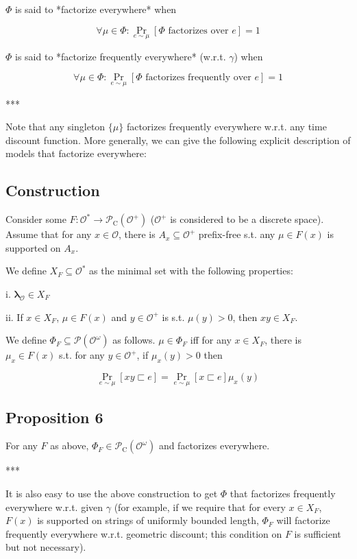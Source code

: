 \documentclass[a4paper]{article}
\DeclareMathOperator{\Prb}{Pr}
\newcommand{\Estr}{\boldsymbol{\lambda}}
\newcommand{\Prob}{\mathcal{P}}
\newcommand{\Obs}{\mathcal{O}}
\newcommand{\ObsO}{\Obs^\omega}
\newcommand{\CC}{\mathcal{P}_{\operatorname{C}}}
\begin{document}
${\Phi}$ is said to *factorize everywhere* when 

$${\forall \mu \in \Phi: \Prb_{e \sim \mu}[\Phi \text{ factorizes over } e] = 1}$$

${\Phi}$ is said to *factorize frequently everywhere* (w.r.t. ${\gamma}$) when

$${\forall \mu \in \Phi: \Prb_{e \sim \mu}[\Phi \text{ factorizes frequently over } e] = 1}$$

***

Note that any singleton ${\{\mu\}}$ factorizes frequently everywhere w.r.t. any time discount function. More generally, we can give the following explicit description of models that factorize everywhere:

\subsection{Construction}

Consider some ${F: \Obs^* \rightarrow \CC(\Obs^+)}$ (${\Obs^+}$ is considered to be a discrete space). Assume that for any ${x \in \Obs}$, there is ${A_x \subseteq \Obs^+}$ prefix-free s.t. any ${\mu \in F(x)}$ is supported on ${A_x}$.

We define ${X_F \subseteq \Obs^*}$ as the minimal set with the following properties:

i. ${\Estr_\Obs \in X_F}$

ii. If ${x \in X_F}$, ${\mu \in F(x)}$ and ${y \in \Obs^+}$ is s.t. ${\mu(y) > 0}$, then ${xy \in X_F}$.

We define ${\Phi_F \subseteq \Prob(\ObsO)}$ as follows. ${\mu \in \Phi_F}$ iff for any ${x \in X_F}$, there is ${\mu_x \in F(x)}$ s.t. for any ${y \in \Obs^+}$, if ${\mu_x(y) > 0}$ then

$$\Prb_{e \sim \mu}[xy \sqsubset e] = \Prb_{e \sim \mu}[x \sqsubset e] \mu_x(y)$$

\subsection{Proposition 6}

For any ${F}$ as above, ${\Phi_F \in \CC(\ObsO)}$ and factorizes everywhere.

***

It is also easy to use the above construction to get ${\Phi}$ that factorizes frequently everywhere w.r.t. given ${\gamma}$ (for example, if we require that for every ${x \in X_F}$, ${F(x)}$ is supported on strings of uniformly bounded length, ${\Phi_F}$ will factorize frequently everywhere w.r.t. geometric discount; this condition on ${F}$ is sufficient but not necessary).
\end{document}
